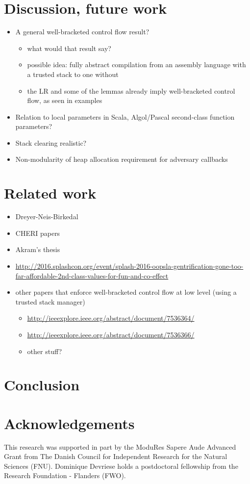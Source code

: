 \documentclass[compsoc,conference,letterpaper,fleqn]{IEEEtran}
\begin{document}
\section{Discussion, future work}
\begin{itemize}
\item A general well-bracketed control flow result?
\begin{itemize}
\item what would that result say?
\item possible idea: fully abstract compilation from an assembly language with
a trusted stack to one without
\item the LR and some of the lemmas already imply well-bracketed control flow, as seen in examples
\end{itemize}
\item Relation to local parameters in Scala, Algol/Pascal second-class function parameters?
\item Stack clearing realistic?
\item Non-modularity of heap allocation requirement for adversary callbacks
\end{itemize}

\section{Related work}

\begin{itemize}
\item Dreyer-Neis-Birkedal
\item CHERI papers
\item Akram's thesis
\item \url{http://2016.splashcon.org/event/splash-2016-oopsla-gentrification-gone-too-far-affordable-2nd-class-values-for-fun-and-co-effect}
\item other papers that enforce well-bracketed control flow at low level
(using a trusted stack manager)
\begin{itemize}
\item \url{http://ieeexplore.ieee.org/abstract/document/7536364/}
\item \url{http://ieeexplore.ieee.org/abstract/document/7536366/}
\item other stuff?
\end{itemize}
\end{itemize}

\section{Conclusion}

\section*{Acknowledgements}
\label{sec:acknowledgements}

This research was supported in part by the ModuRes Sapere Aude Advanced Grant from The Danish Council for Independent Research for the Natural Sciences (FNU).
Dominique Devriese holds a postdoctoral fellowship from the Research Foundation - Flanders (FWO).

%


\end{document}
